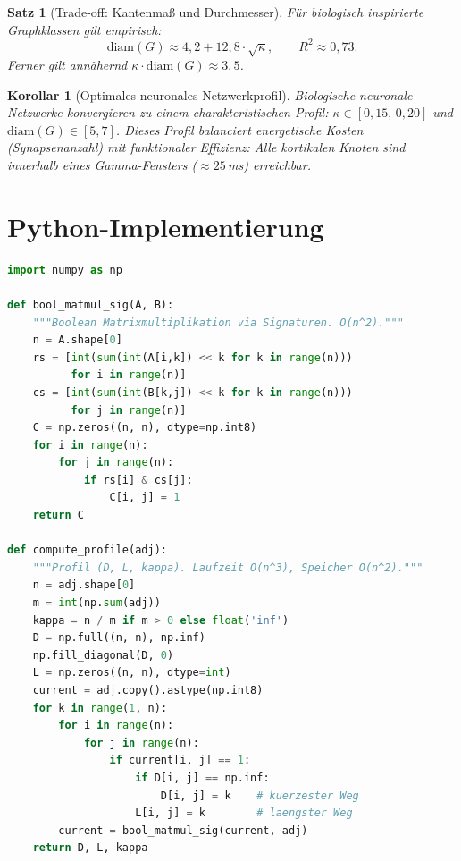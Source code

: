 ﻿\documentclass[a4paper,12pt,openany,oneside]{book}
\theoremstyle{definition}
\theoremstyle{plain}
\newtheorem{satz}{Satz}[chapter]
\newtheorem{korollar}{Korollar}[chapter]
\theoremstyle{remark}
\begin{document}
\begin{satz}[Trade-off: Kantenma\ss{} und Durchmesser]
  \label{satz:tradeoff}
  F\"ur biologisch inspirierte Graphklassen gilt empirisch:
  \[
    \mathrm{diam}(G) \approx 4{,}2 + 12{,}8 \cdot \sqrt{\kappa},
    \qquad R^2 \approx 0{,}73.
  \]
  Ferner gilt ann\"ahernd $\kappa \cdot \mathrm{diam}(G) \approx 3{,}5$.
\end{satz}

\begin{korollar}[Optimales neuronales Netzwerkprofil]
  Biologische neuronale Netzwerke konvergieren zu einem charakteristischen
  Profil: $\kappa \in [0{,}15,\,0{,}20]$ und $\mathrm{diam}(G) \in [5,7]$.
  Dieses Profil balanciert energetische Kosten (Synapsenanzahl) mit
  funktionaler Effizienz: Alle kortikalen Knoten sind innerhalb eines
  Gamma-Fensters ($\approx 25$\,ms) erreichbar.
\end{korollar}

\section{Python-Implementierung}

\begin{lstlisting}[language=Python,
  caption={Vollst\"andige Profilberechnung mit Signatur-Methode},
  label=lst:profil]
import numpy as np

def bool_matmul_sig(A, B):
    """Boolean Matrixmultiplikation via Signaturen. O(n^2)."""
    n = A.shape[0]
    rs = [int(sum(int(A[i,k]) << k for k in range(n)))
          for i in range(n)]
    cs = [int(sum(int(B[k,j]) << k for k in range(n)))
          for j in range(n)]
    C = np.zeros((n, n), dtype=np.int8)
    for i in range(n):
        for j in range(n):
            if rs[i] & cs[j]:
                C[i, j] = 1
    return C

def compute_profile(adj):
    """Profil (D, L, kappa). Laufzeit O(n^3), Speicher O(n^2)."""
    n = adj.shape[0]
    m = int(np.sum(adj))
    kappa = n / m if m > 0 else float('inf')
    D = np.full((n, n), np.inf)
    np.fill_diagonal(D, 0)
    L = np.zeros((n, n), dtype=int)
    current = adj.copy().astype(np.int8)
    for k in range(1, n):
        for i in range(n):
            for j in range(n):
                if current[i, j] == 1:
                    if D[i, j] == np.inf:
                        D[i, j] = k    # kuerzester Weg
                    L[i, j] = k        # laengster Weg
        current = bool_matmul_sig(current, adj)
    return D, L, kappa
\end{lstlisting}
\end{document}
